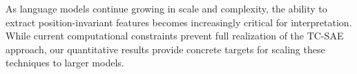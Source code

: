 \documentclass{article} %
\begin{document}
As language models continue growing in scale and complexity, the ability to extract position-invariant features becomes increasingly critical for interpretation. While current computational constraints prevent full realization of the TC-SAE approach, our quantitative results provide concrete targets for scaling these techniques to larger models.



\end{document}
